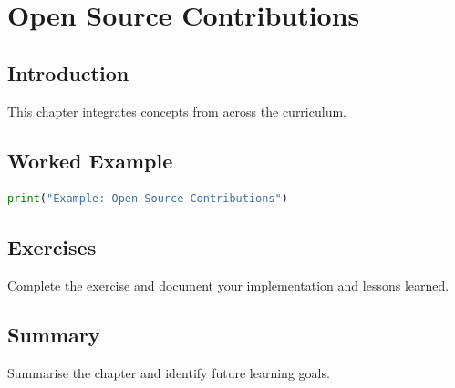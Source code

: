 \chapter{Open Source Contributions}
\label{chap:vol11-6}



\section{Introduction}
This chapter integrates concepts from across the curriculum.

\section{Worked Example}
\begin{lstlisting}[language=Python]
print("Example: Open Source Contributions")
\end{lstlisting}

\section{Exercises}
\begin{exercise}
Complete the exercise and document your implementation and lessons learned.
\end{exercise}

\section{Summary}
Summarise the chapter and identify future learning goals.

